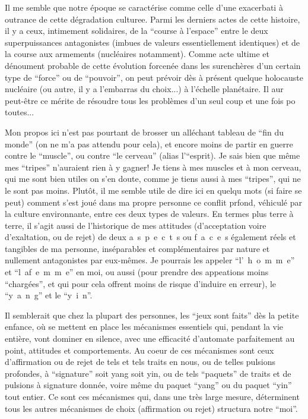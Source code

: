 

Il me semble que notre époque se caractérise comme celle d'une exacerbati à outrance de cette dégradation culturee. Parmi les derniers actes de cette histoire, il y a ceux, intimement solidaires, de la ``course à l'espace'' entre le deux superpuissances antagonistes (imbues de valeurs essentiellement identiques) et de la course aux armements (nucléaires notamment). Comme acte ultime et dénoument probable de cette évolution forcenée dans les surenchères d'un certain type de ``force'' ou de ``pouvoir'', on peut prévoir dès à présent quelque holocauste nucléaire (ou autre, il y a l'embarras du choix...) à l'échelle planétaire. Il aur peut-être ce mérite de résoudre tous les problèmes d'un seul coup et une fois po toutes...

Mon propos ici n'est pas pourtant de brosser un alléchant tableau de ``fin du monde'' (on ne m'a pas attendu pour cela), et encore moins de partir en guerre contre le ``muscle'', ou contre ``le cerveau'' (alias l'``esprit). Je sais bien que même mes ``tripes'' n'auraient rien à y gagner! Je tiens à mes muscles et à mon cerveau, qui me sont bien utiles on s'en doute, comme je tiens aussi à mes ``tripes'', qui ne le sont pas moins. Plutôt, il me semble utile de dire ici en quelqu mots (si faire se peut) comment s'est joué dans ma propre personne ce conflit prfond, véhiculé par la culture environnante, entre ces deux types de valeurs. En termes plus terre à terre, il s'agit aussi de l'historique de mes attitudes (d'acceptation voire d'exaltation, ou de rejet) de deux \mbox{a s p e c t s} ou \mbox{f a c e s} également réels et tangibles de ma personne, inséparables et complémentaires par nature\handwritten{\unsure{,}} et nullement antagonistes par eux-mêmes. Je pourrais les appeler ``\mbox{l' h o m m e}'' et ``\mbox{l a\quad f e m m e}'' en moi, ou aussi (pour prendre des appeations moins ``chargées'', et qui pour cela offrent moins de risque d'induire en erreur), le ``\mbox{y a n g}'' et le ``\mbox{y i n}''.

Il semblerait que chez la plupart des personnes, les ``jeux sont faits'' dès la petite enfance, où se mettent en place les mécanismes essentiels qui, pendant la vie entière, vont dominer en silence, avec une efficacité d'automate parfaitement au point, attitudes et comportements. Au coeur de ces mécanismes sont ceux d'affirmation ou de rejet de tels et tels traits en nous, ou de telles pulsions profondes, à ``signature'' soit yang soit yin, ou de tels  ``paquets'' de traits et de pulsions à signature donnée, voire même du paquet ``yang'' ou du paquet ``yin'' tout entier. Ce sont ces mécanismes qui, dans une très large mesure, déterminent tous les autres mécanismes de choix (affirmation ou rejet) structura notre ``moi''.


